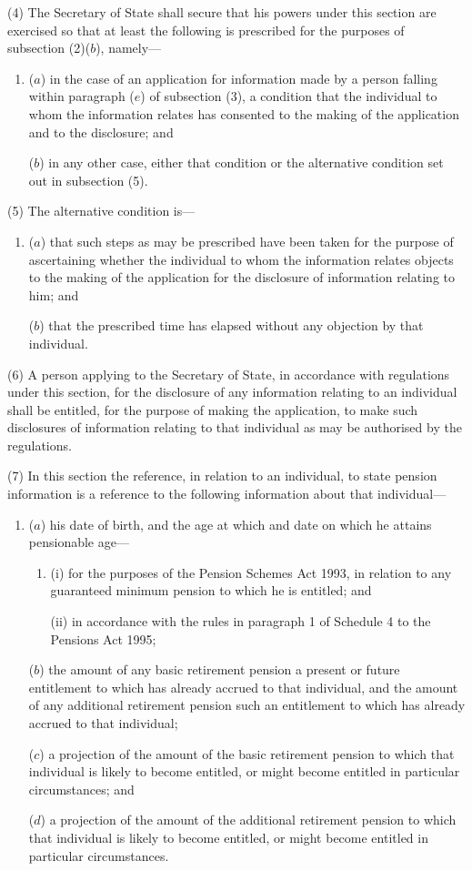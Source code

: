 \documentclass[12pt,a4paper]{article}
\begin{document}
(4) The Secretary of State shall secure that his powers under this section are exercised so that at least the following is prescribed for the purposes of subsection (2)($b$), namely—
\begin{enumerate}\item[]
($a$) in the case of an application for information made by a person falling within paragraph ($e$)  of subsection (3), a condition that the individual to whom the information relates has consented to the making of the application and to the disclosure; and

($b$) in any other case, either that condition or the alternative condition set out in subsection (5).
\end{enumerate}

(5) The alternative condition is—
\begin{enumerate}\item[]
($a$) that such steps as may be prescribed have been taken for the purpose of ascertaining whether the individual to whom the information relates objects to the making of the application for the disclosure of information relating to him; and

($b$) that the prescribed time has elapsed without any objection by that individual.
\end{enumerate}

(6) A person applying to the Secretary of State, in accordance with regulations under this section, for the disclosure of any information relating to an individual shall be entitled, for the purpose of making the application, to make such disclosures of information relating to that individual as may be authorised by the regulations.

(7) In this section the reference, in relation to an individual, to state pension information is a reference to the following information about that individual—
\begin{enumerate}\item[]
($a$) his date of birth, and the age at which and date on which he attains pensionable age—
\begin{enumerate}\item[]
(i) for the purposes of the Pension Schemes Act 1993, in relation to any guaranteed minimum pension to which he is entitled; and

(ii) in accordance with the rules in paragraph 1 of Schedule 4 to the Pensions Act 1995;
\end{enumerate}

($b$) the amount of any basic retirement pension a present or future entitlement to which has already accrued to that individual, and the amount of any additional retirement pension such an entitlement to which has already accrued to that individual;

($c$) a projection of the amount of the basic retirement pension to which that individual is likely to become entitled, or might become entitled in particular circumstances; and

($d$) a projection of the amount of the additional retirement pension to which that individual is likely to become entitled, or might become entitled in particular circumstances.
\end{enumerate}
\end{document}
